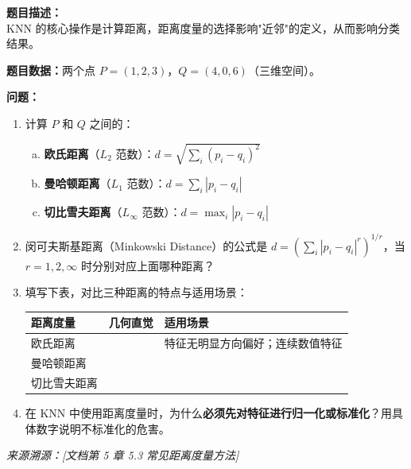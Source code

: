 \documentclass[a4paper,11pt]{ctexart}
\begin{document}
\begin{problembox}
    \textbf{题目描述：}\\
    KNN 的核心操作是计算距离，距离度量的选择影响"近邻"的定义，从而影响分类结果。

    \vspace{0.2cm}
    \textbf{题目数据：}两个点 $P=(1,2,3)$，$Q=(4,0,6)$（三维空间）。

    \vspace{0.2cm}
    \textbf{问题：}
    \begin{enumerate}[(1)]
        \item 计算 $P$ 和 $Q$ 之间的：
        \begin{enumerate}[a.]
            \item \textbf{欧氏距离}（$L_2$ 范数）：$d = \sqrt{\sum_i(p_i-q_i)^2}$
            \item \textbf{曼哈顿距离}（$L_1$ 范数）：$d = \sum_i|p_i-q_i|$
            \item \textbf{切比雪夫距离}（$L_\infty$ 范数）：$d = \max_i|p_i-q_i|$
        \end{enumerate}

        \item 闵可夫斯基距离（Minkowski Distance）的公式是 $d = \left(\sum_i|p_i-q_i|^r\right)^{1/r}$，当 $r=1, 2, \infty$ 时分别对应上面哪种距离？

        \item 填写下表，对比三种距离的特点与适用场景：
        \begin{center}
        \begin{tabular}{p{2.5cm} p{4cm} p{5cm}}
            \toprule
            距离度量 & 几何直觉 & 适用场景 \\
            \midrule
            欧氏距离 & \underline{\hspace{3.5cm}} & 特征无明显方向偏好；连续数值特征 \\[1.2em]
            曼哈顿距离 & \underline{\hspace{3.5cm}} & \underline{\hspace{4.5cm}} \\[1.2em]
            切比雪夫距离 & \underline{\hspace{3.5cm}} & \underline{\hspace{4.5cm}} \\
            \bottomrule
        \end{tabular}
        \end{center}

        \item 在 KNN 中使用距离度量时，为什么\textbf{必须先对特征进行归一化或标准化}？用具体数字说明不标准化的危害。
    \end{enumerate}
    {\color{gray}\small\textit{来源溯源：[文档第 5 章 5.3 常见距离度量方法]}}
\end{problembox}
\end{document}

